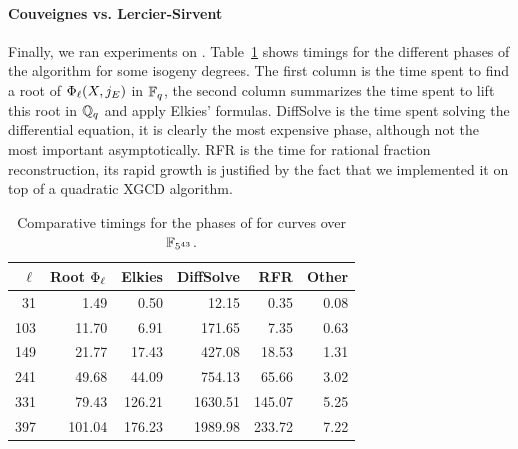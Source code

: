 \paragraph{Couveignes vs. Lercier-Sirvent}
Finally, we ran experiments on
\hyperref[alg:le-si]{}. Table~\ref{tab:ls} shows
timings for the different phases of the algorithm for some isogeny
degrees. The first column is the time spent to find a root of
$\Phi_\ell(X,j_E)$ in $\mathbb{F}_q$, the second column summarizes the time
spent to lift this root in $\mathbb{Q}_q$ and apply Elkies'
formulas. DiffSolve is the time spent solving the differential
equation, it is clearly the most expensive phase, although not the
most important asymptotically. RFR is the time for rational fraction
reconstruction, its rapid growth is justified by the fact that we
implemented it on top of a quadratic XGCD algorithm.

\begin{table}[ht]
  \centering
  \begin{tabular}{r r r r r r}
    \hline
    $\ell$ & Root $\Phi_\ell$ & Elkies & DiffSolve & RFR & Other\\
    \hline
    31&1.49&0.50&12.15&0.35&0.08\\
    103&11.70&6.91&171.65&7.35&0.63\\
    149&21.77&17.43&427.08&18.53&1.31\\
    241&49.68&44.09&754.13&65.66&3.02\\
    331&79.43&126.21&1630.51&145.07&5.25\\
    397&101.04&176.23&1989.98&233.72&7.22\\
    \hline
  \end{tabular}
  \caption{Comparative timings for the phases of \hyperref[alg:le-si]{} for curves over $\mathbb{F}_{5^{43}}$.}
  \label{tab:ls}
\end{table}


